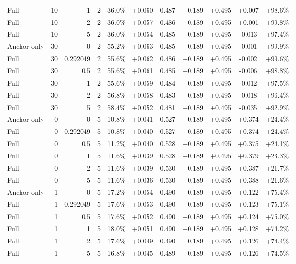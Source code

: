 \begin{table}[htbp]
\begin{tabular}{lrrrccccccc}
Full & 10 & 1 & 2 & 36.0\% & +0.060 & 0.487 & +0.189 & +0.495 & +0.007 & +98.6\% \\
Full & 10 & 2 & 2 & 36.0\% & +0.057 & 0.486 & +0.189 & +0.495 & +0.001 & +99.8\% \\
Full & 10 & 5 & 2 & 36.0\% & +0.054 & 0.485 & +0.189 & +0.495 & -0.013 & +97.4\% \\
Anchor only & 30 & 0 & 2 & 55.2\% & +0.063 & 0.485 & +0.189 & +0.495 & -0.001 & +99.9\% \\
Full & 30 & 0.292049 & 2 & 55.6\% & +0.062 & 0.486 & +0.189 & +0.495 & -0.002 & +99.6\% \\
Full & 30 & 0.5 & 2 & 55.6\% & +0.061 & 0.485 & +0.189 & +0.495 & -0.006 & +98.8\% \\
Full & 30 & 1 & 2 & 55.6\% & +0.059 & 0.484 & +0.189 & +0.495 & -0.012 & +97.5\% \\
Full & 30 & 2 & 2 & 56.8\% & +0.058 & 0.483 & +0.189 & +0.495 & -0.018 & +96.4\% \\
Full & 30 & 5 & 2 & 58.4\% & +0.052 & 0.481 & +0.189 & +0.495 & -0.035 & +92.9\% \\
Anchor only & 0 & 0 & 5 & 10.8\% & +0.041 & 0.527 & +0.189 & +0.495 & +0.374 & +24.4\% \\
Full & 0 & 0.292049 & 5 & 10.8\% & +0.040 & 0.527 & +0.189 & +0.495 & +0.374 & +24.4\% \\
Full & 0 & 0.5 & 5 & 11.2\% & +0.040 & 0.528 & +0.189 & +0.495 & +0.375 & +24.1\% \\
Full & 0 & 1 & 5 & 11.6\% & +0.039 & 0.528 & +0.189 & +0.495 & +0.379 & +23.3\% \\
Full & 0 & 2 & 5 & 11.6\% & +0.039 & 0.530 & +0.189 & +0.495 & +0.387 & +21.7\% \\
Full & 0 & 5 & 5 & 11.6\% & +0.036 & 0.530 & +0.189 & +0.495 & +0.388 & +21.6\% \\
Anchor only & 1 & 0 & 5 & 17.2\% & +0.054 & 0.490 & +0.189 & +0.495 & +0.122 & +75.4\% \\
Full & 1 & 0.292049 & 5 & 17.6\% & +0.053 & 0.490 & +0.189 & +0.495 & +0.123 & +75.1\% \\
Full & 1 & 0.5 & 5 & 17.6\% & +0.052 & 0.490 & +0.189 & +0.495 & +0.124 & +75.0\% \\
Full & 1 & 1 & 5 & 18.0\% & +0.051 & 0.490 & +0.189 & +0.495 & +0.128 & +74.2\% \\
Full & 1 & 2 & 5 & 17.6\% & +0.049 & 0.490 & +0.189 & +0.495 & +0.126 & +74.4\% \\
Full & 1 & 5 & 5 & 16.8\% & +0.045 & 0.489 & +0.189 & +0.495 & +0.126 & +74.5\% \\

\end{tabular}
\end{table}
